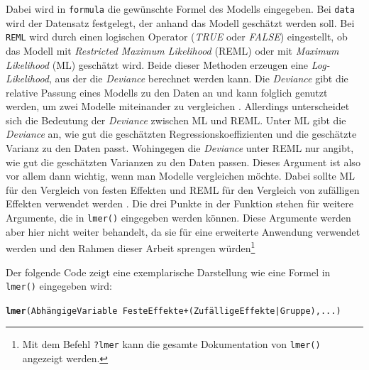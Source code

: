 \documentclass[12pt, a4paper]{article}\usepackage[]{graphicx}\usepackage[]{color}
\makeatletter
\newcommand{\hlkwd}[1]{\textcolor[rgb]{0.737,0.353,0.396}{\textbf{#1}}}%
\newenvironment{kframe}{%
 \def\at@end@of@kframe{}%
 \ifinner\ifhmode%
  \def\at@end@of@kframe{\end{minipage}}%
  \begin{minipage}{\columnwidth}%
 \fi\fi%
 \def\FrameCommand##1{\hskip\@totalleftmargin \hskip-\fboxsep
 \colorbox{shadecolor}{##1}\hskip-\fboxsep
     \hskip-\linewidth \hskip-\@totalleftmargin \hskip\columnwidth}%
 \MakeFramed {\advance\hsize-\width
   \@totalleftmargin\z@ \linewidth\hsize
   \@setminipage}}%
 {\par\unskip\endMakeFramed%
 \at@end@of@kframe}
\newenvironment{knitrout}{}{} %
\makeatother
\begin{document}
Dabei wird in \texttt{formula} die gewünschte Formel des Modells eingegeben. Bei \texttt{data} wird der Datensatz festgelegt, der anhand das Modell geschätzt werden soll. Bei \texttt{REML} wird durch einen logischen Operator (\textit{TRUE} oder \textit{FALSE}) eingestellt, ob das Modell mit \textit{Restricted Maximum Likelihood} (REML) oder mit \textit{Maximum Likelihood} (ML) geschätzt wird. Beide dieser Methoden erzeugen eine \textit{Log-Likelihood}, aus der die \textit{Deviance} berechnet werden kann. Die \textit{Deviance} gibt die relative Passung eines Modells zu den Daten an und kann folglich genutzt werden, um zwei Modelle miteinander zu vergleichen \citep{SnijdersTomA.B2012Ma:a}. Allerdings unterscheidet sich die Bedeutung der \textit{Deviance} zwischen ML und REML. Unter ML gibt die \textit{Deviance} an, wie gut die geschätzten Regressionskoeffizienten und die geschätzte Varianz zu den Daten passt. Wohingegen die \textit{Deviance} unter REML nur angibt, wie gut die geschätzten Varianzen zu den Daten passen. Dieses Argument ist also vor allem dann wichtig, wenn man Modelle vergleichen möchte. Dabei sollte ML für den Vergleich von festen Effekten und REML für den Vergleich von zufälligen Effekten verwendet werden \citep{PEUGH201085}. Die drei Punkte in der Funktion stehen für weitere Argumente, die in \texttt{lmer()} eingegeben werden können. Diese Argumente werden aber hier nicht weiter behandelt, da sie für eine erweiterte Anwendung verwendet werden und den Rahmen dieser Arbeit sprengen würden\footnote{Mit dem Befehl \texttt{?lmer} kann die gesamte Dokumentation von \texttt{lmer()} angezeigt werden.}

Der folgende Code zeigt eine exemplarische Darstellung wie eine Formel in \texttt{lmer()} eingegeben wird:

\singlespacing
\begin{knitrout}
\color{fgcolor}\begin{kframe}
\begin{alltt}
\hlkwd{lmer}(Abhängige Variable ~ Feste Effekte + (Zufällige Effekte | Gruppe),...)
\end{alltt}
\end{kframe}
\end{knitrout}
\end{document}
